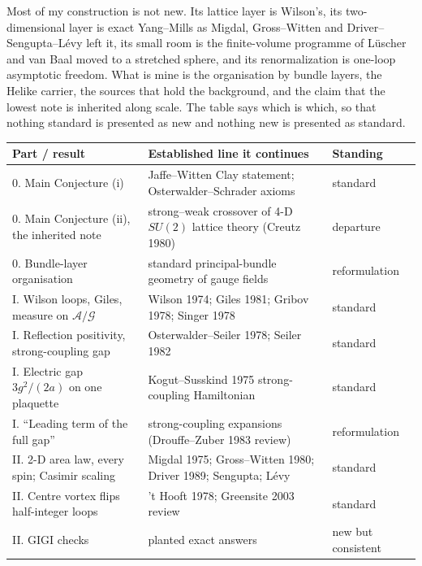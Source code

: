 \newpage
{}

Most of my construction is not new. Its lattice layer is Wilson's, its two-dimensional layer is exact Yang--Mills as
Migdal, Gross--Witten and Driver--Sengupta--L\'evy left it, its small room is the finite-volume programme of L\"uscher and
van Baal moved to a stretched sphere, and its renormalization is one-loop asymptotic freedom. What is mine is the
organisation by bundle layers, the Helike carrier, the sources that hold the background, and the claim that the lowest
note is inherited along scale. The table says which is which, so that nothing standard is presented as new and nothing new
is presented as standard.

\begin{center}\small\setlength{\tabcolsep}{4pt}\renewcommand{\arraystretch}{0.97}
\begin{tabular}{@{}p{2.2in}p{3.5in}p{1.1in}@{}}\toprule
\textbf{Part / result} & \textbf{Established line it continues} & \textbf{Standing}\\\midrule
0. Main Conjecture (i) & Jaffe--Witten Clay statement; Osterwalder--Schrader axioms & standard\\
0. Main Conjecture (ii), the inherited note & strong--weak crossover of 4-D $SU(2)$ lattice theory (Creutz 1980) & departure\\
0. Bundle-layer organisation & standard principal-bundle geometry of gauge fields & reformulation\\\midrule
I. Wilson loops, Giles, measure on $\mathcal A/\mathcal G$ & Wilson 1974; Giles 1981; Gribov 1978; Singer 1978 & standard\\
I. Reflection positivity, strong-coupling gap & Osterwalder--Seiler 1978; Seiler 1982 & standard\\
I. Electric gap $3g^2/(2a)$ on one plaquette & Kogut--Susskind 1975 strong-coupling Hamiltonian & standard\\
I. ``Leading term of the full gap'' & strong-coupling expansions (Drouffe--Zuber 1983 review) & reformulation\\\midrule
II. 2-D area law, every spin; Casimir scaling & Migdal 1975; Gross--Witten 1980; Driver 1989; Sengupta; L\'evy & standard\\
II. Centre vortex flips half-integer loops & 't Hooft 1978; Greensite 2003 review & standard\\
II. GIGI checks & planted exact answers & new but consistent\\\bottomrule
\end{tabular}
\end{center}

